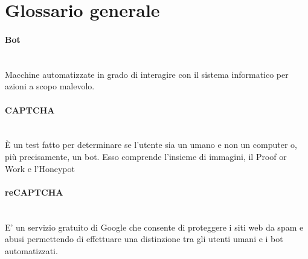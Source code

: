 \section{Glossario generale}

\paragraph{Bot}~\smallskip \\
Macchine automatizzate in grado di interagire con il sistema informatico per azioni a scopo malevolo.

\paragraph{CAPTCHA}~\smallskip \\
È un test fatto per determinare se l'utente sia un umano e non un computer o, più precisamente, un bot.
Esso comprende l'insieme di immagini, il Proof or Work e l'Honeypot

\paragraph{reCAPTCHA}~\smallskip \\
E' un servizio gratuito di Google che consente di proteggere i siti web da spam e abusi permettendo di effettuare una distinzione tra gli utenti umani e i bot automatizzati.
